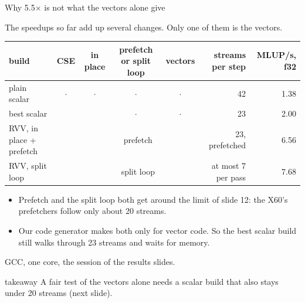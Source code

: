 \documentclass[aspectratio=169,10pt,t]{beamer}
\newcommand{\sx}[1]{#1\ensuremath{\times}} %
\newcommand{\yes}{\textcolor{psteal}{\ding{51}}}
\newcommand{\no}{\textcolor{psgray!70}{$\cdot$}}
\newcommand{\takeaway}[1]{\par\vfill
  \begin{beamercolorbox}[wd=\textwidth,sep=4pt,rounded=true]{takeaway}
    \small #1
  \end{beamercolorbox}}
\begin{document}
\begin{frame}{Why \sx{5.5} is not what the vectors alone give}
  \vspace{1mm}
  {\small The speedups so far add up several changes. Only one of them is the vectors.\par}
  \vspace{2mm}
  \centering
  {\footnotesize\renewcommand{\arraystretch}{1.15}
  \begin{tabular}{@{}lccccrr@{}}
    \toprule
    \textbf{build} & \textbf{CSE} & \textbf{in place} & \textbf{prefetch or split loop} & \textbf{vectors}
      & \textbf{streams per step} & \textbf{MLUP/s, f32}\\
    \midrule
    plain scalar & \no & \no & \no & \no & 42 & 1.38\\
    best scalar & \yes & \yes & \no & \no & 23 & 2.00\\
    RVV, in place + prefetch & \yes & \yes & \yes\ prefetch & \yes & 23, prefetched & 6.56\\
    RVV, split loop & \yes & \yes & \yes\ split loop & \yes & at most 7 per pass & 7.68\\
    \bottomrule
  \end{tabular}\par}
  \vspace{3mm}
  \raggedright
  \begin{itemize}\small
    \item Prefetch and the split loop both get around the limit of slide 12: the X60's prefetchers follow
          only about 20 streams.
    \item Our code generator makes both only for vector code. So the best scalar build still walks
          through 23 streams and waits for memory.
  \end{itemize}
  {\scriptsize\color{psgray}GCC, one core, the session of the results slides.\par}
  \takeaway{A fair test of the vectors alone needs a scalar build that also stays under 20 streams
    (next slide).}
\end{frame}
\end{document}
